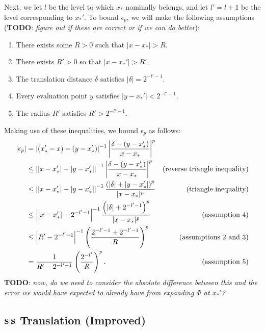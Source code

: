 Next, we let $l$ be the level to which $x_*$ nominally belongs, and
let $l' = l + 1$ be the level corresponding to $x_*'$. To bound
$\epsilon_p$, we will make the following assumptions (\textbf{TODO}: \emph{figure out
  if these are correct or if we can do better}):
\begin{enumerate}
\item There exists some $R > 0$ such that $|x - x_*| > R$.
\item There exists $R' > 0$ so that $|x - x_*'| > R'$.
\item The translation distance $\delta$ satisfies $|\delta| = 2^{-l'-1}$.
\item Every evaluation point $y$ satisfies $|y - x_*'| < 2^{-l'-1}$.
\item The radius $R'$ satisfies $R' > 2^{-l'-1}$.
\end{enumerate}
Making use of these inequalities, we bound $\epsilon_p$ as follows:
\begin{align*}
  |\epsilon_p|
  &= |(x_*' - x) - (y - x_*')|^{-1} \left|\frac{\delta - (y - x_*')}{x - x_*}\right|^p \\
  &\leq \left|\left|x - x_*'\right| - \left|y - x_*'\right|\right|^{-1} \left|\frac{\delta - (y - x_*')}{x - x_*}\right|^p & \mbox{(reverse triangle inequality)} \\
  &\leq \left|\left|x - x_*'\right| - \left|y - x_*'\right|\right|^{-1} \frac{\left(|\delta| + |y - x_*'|\right)^p}{|x - x_*|^p} & \mbox{(triangle inequality)} \\
  &\leq \left|\left|x - x_*'\right| - 2^{-l'-1}\right|^{-1} \frac{\left(|\delta| + 2^{-l'-1}\right)^p}{|x - x_*|^p} & \mbox{(assumption 4)} \\
  &\leq \left|R' - 2^{-l'-1}\right|^{-1} \left(\frac{2^{-l'-1} + 2^{-l'-1}}{R}\right)^p & \mbox{(assumptions 2 and 3)} \\
  &= \frac{1}{R' - 2^{-l'-1}} \left(\frac{2^{-l'}}{R}\right)^p. & \mbox{(assumption 5)}
\end{align*}
\textbf{TODO}: \emph{now, do we need to consider the absolute difference between this and the error we would have expected to already have from expanding $\Phi$ at $x_*'$?}

\subsection{$\bold{S}|\bold{S}$ Translation (Improved)}

